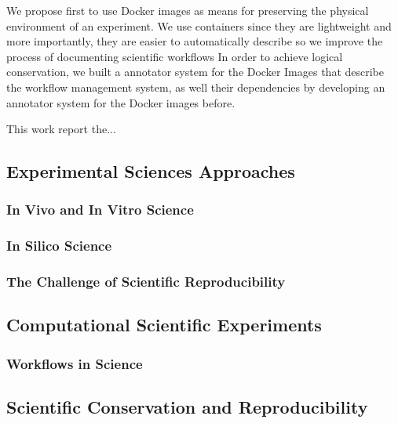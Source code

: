 
We propose first to use Docker images as means for preserving the physical environment of an experiment. We use containers since they are lightweight and more importantly, they are easier to automatically describe so we  improve the process of documenting scientific workflows
In order to achieve logical conservation, we built a annotator system for the Docker Images that describe the workflow management system, as well their dependencies by developing an annotator system for the Docker images before.


This work report the...







\subsection{Experimental Sciences Approaches}

\subsubsection{In Vivo and In Vitro Science}

\subsubsection{In Silico Science}

\subsubsection{The Challenge of Scientific Reproducibility}


\subsection{Computational Scientific Experiments}

\subsubsection{Workflows in Science}


\subsection{Scientific Conservation and Reproducibility}
